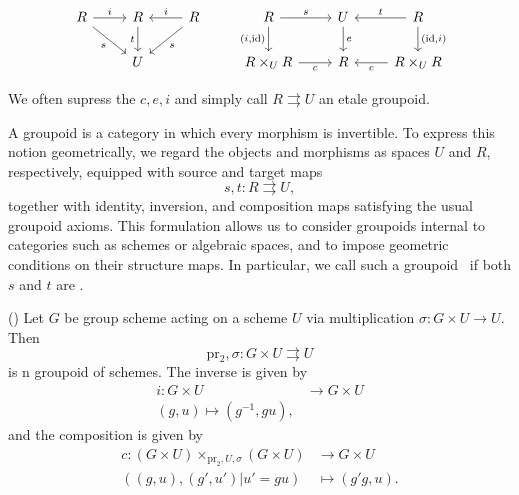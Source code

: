 \begin{definition}
\begin{enumerate}
		\[\begin{tikzcd}
			R & R & R & R & U & R \\
			& U && {R\times_UR} & R & {R\times_UR}
			\arrow["i", from=1-1, to=1-2]
			\arrow["s"', from=1-1, to=2-2]
			\arrow["t"', from=1-2, to=2-2]
			\arrow["i"', from=1-3, to=1-2]
			\arrow["s", from=1-3, to=2-2]
			\arrow["s", from=1-4, to=1-5]
			\arrow["{(i, \mathrm{id})}"', from=1-4, to=2-4]
			\arrow["e", from=1-5, to=2-5]
			\arrow["t"', from=1-6, to=1-5]
			\arrow["{(\mathrm{id},i)}", from=1-6, to=2-6]
			\arrow["c"', from=2-4, to=2-5]
			\arrow["c", from=2-6, to=2-5]
		\end{tikzcd}\]
	\end{enumerate}
	We often supress the $c, e, i$ and simply call $R\rightrightarrows U$ an etale groupoid.
\end{definition}

\begin{remark}
	A groupoid is a category in which every morphism is invertible.
	To express this notion geometrically, we regard the objects and
	morphisms as spaces $U$ and $R$, respectively, equipped with source
	and target maps
	\[
	s,t\colon R\rightrightarrows U,
	\]
	together with identity, inversion, and composition maps satisfying
	the usual groupoid axioms.
	This formulation allows us to consider groupoids internal to
	categories such as schemes or algebraic spaces, and to impose
	geometric conditions on their structure maps.
	In particular, we call such a groupoid \etale\ if both $s$ and $t$
	are \etale.
\end{remark}

\begin{example}
	(\cite[][Example 4.4.3]{alper2026stacks})
	Let $G$ be group scheme acting on a scheme $U$ via multiplication $\sigma: G\times U\to U$. Then
	\[
		\mathrm{pr_2}, \sigma: G\times U \rightrightarrows U
	\]
	is n \etale groupoid of schemes. The inverse is given by 
	\begin{align*}
		i:G\times U &\to G\times U \\
		(g, u) \mapsto (g^{-1}, gu),
	\end{align*}
	and the composition is given by
	\begin{align*}
		c:(G\times U) \times_{\mathrm{pr}_2, U, \sigma} (G\times U) &\to G\times U \\
		((g, u), (g', u') | u' = gu) &\mapsto (g'g, u).
	\end{align*}

\end{example}

